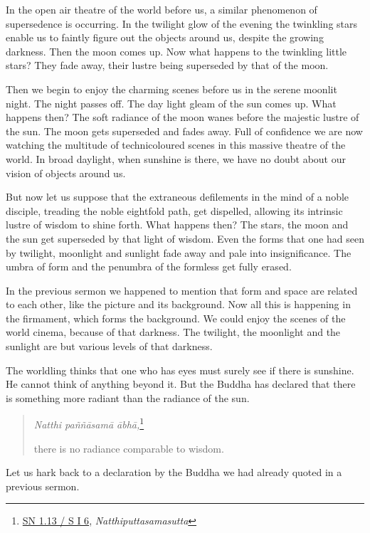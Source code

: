 In the open air theatre of the world before us, a similar phenomenon of supersedence is occurring. In the twilight glow of the evening the twinkling stars enable us to faintly figure out the objects around us, despite the growing darkness. Then the moon comes up. Now what happens to the twinkling little stars? They fade away, their lustre being superseded by that of the moon.

Then we begin to enjoy the charming scenes before us in the serene moonlit night. The night passes off. The day light gleam of the sun comes up. What happens then? The soft radiance of the moon wanes before the majestic lustre of the sun. The moon gets superseded and fades away. Full of confidence we are now watching the multitude of technicoloured scenes in this massive theatre of the world. In broad daylight, when sunshine is there, we have no doubt about our vision of objects around us.

\enlargethispage{\baselineskip}

But now let us suppose that the extraneous defilements in the mind of a noble disciple, treading the noble eightfold path, get dispelled, allowing its intrinsic lustre of wisdom to shine forth. What happens then? The stars, the moon and the sun get superseded by that light of wisdom. Even the forms that one had seen by twilight, moonlight and sunlight fade away and pale into insignificance. The umbra of form and the penumbra of the formless get fully erased.

In the previous sermon we happened to mention that form and space are related to each other, like the picture and its background. Now all this is happening in the firmament, which forms the background. We could enjoy the scenes of the world cinema, because of that darkness. The twilight, the moonlight and the sunlight are but various levels of that darkness.

The worldling thinks that one who has eyes must surely see if there is sunshine. He cannot think of anything beyond it. But the Buddha has declared that there is something more radiant than the radiance of the sun.

\begin{quote}
\emph{Natthi paññāsamā ābhā,}\footnote{\href{https://suttacentral.net/sn1.13/pli/ms}{SN 1.13 / S I 6}, \emph{Natthiputtasamasutta}}

there is no radiance comparable to wisdom.
\end{quote}

Let us hark back to a declaration by the Buddha we had already quoted in a previous sermon.

